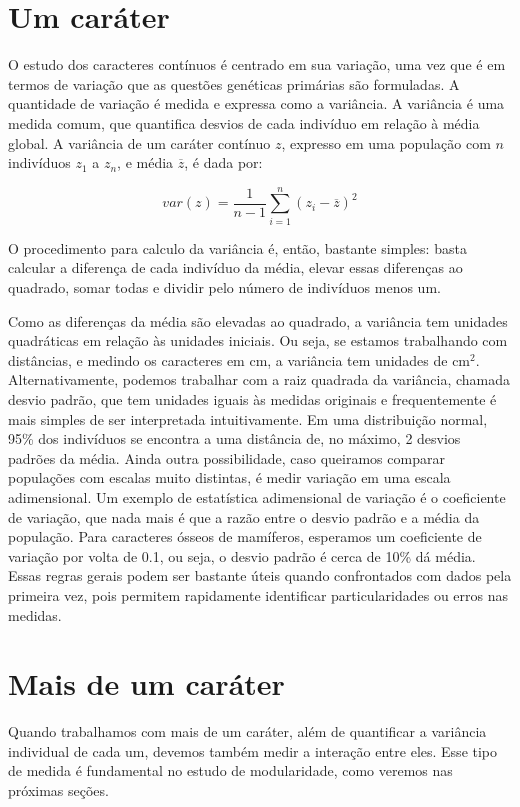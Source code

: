 \documentclass[portuges,]{tufte-handout}
\begin{document}
\section{Um caráter}\label{um-caruxe1ter}

O estudo dos caracteres contínuos é centrado em sua variação, uma vez
que é em termos de variação que as questões genéticas primárias são
formuladas. A quantidade de variação é medida e expressa como a
variância. A variância é uma medida comum, que quantifica desvios de
cada indivíduo em relação à média global. A variância de um caráter
contínuo \(z\), expresso em uma população com \(n\) indivíduos \(z_1\) a
\(z_n\), e média \(\overline z\), é dada por:

\[
var(z) = \frac{1}{n-1}\sum_{i=1}^n (z_i - \overline z)^2
\]

O procedimento para calculo da variância é, então, bastante simples:
basta calcular a diferença de cada indivíduo da média, elevar essas
diferenças ao quadrado, somar todas e dividir pelo número de indivíduos
menos um.

Como as diferenças da média são elevadas ao quadrado, a variância tem
unidades quadráticas em relação às unidades iniciais. Ou seja, se
estamos trabalhando com distâncias, e medindo os caracteres em cm, a
variância tem unidades de cm\(^2\). Alternativamente, podemos trabalhar
com a raiz quadrada da variância, chamada desvio padrão, que tem
unidades iguais às medidas originais e frequentemente é mais simples de
ser interpretada intuitivamente. Em uma distribuição normal, 95\% dos
indivíduos se encontra a uma distância de, no máximo, 2 desvios padrões
da média. Ainda outra possibilidade, caso queiramos comparar populações
com escalas muito distintas, é medir variação em uma escala
adimensional. Um exemplo de estatística adimensional de variação é o
coeficiente de variação, que nada mais é que a razão entre o desvio
padrão e a média da população. Para caracteres ósseos de mamíferos,
esperamos um coeficiente de variação por volta de 0.1, ou seja, o desvio
padrão é cerca de 10\% dá média. Essas regras gerais podem ser bastante
úteis quando confrontados com dados pela primeira vez, pois permitem
rapidamente identificar particularidades ou erros nas medidas.

\section{Mais de um caráter}\label{mais-de-um-caruxe1ter}

Quando trabalhamos com mais de um caráter, além de quantificar a
variância individual de cada um, devemos também medir a interação entre
eles. Esse tipo de medida é fundamental no estudo de modularidade, como
veremos nas próximas seções.
\end{document}
